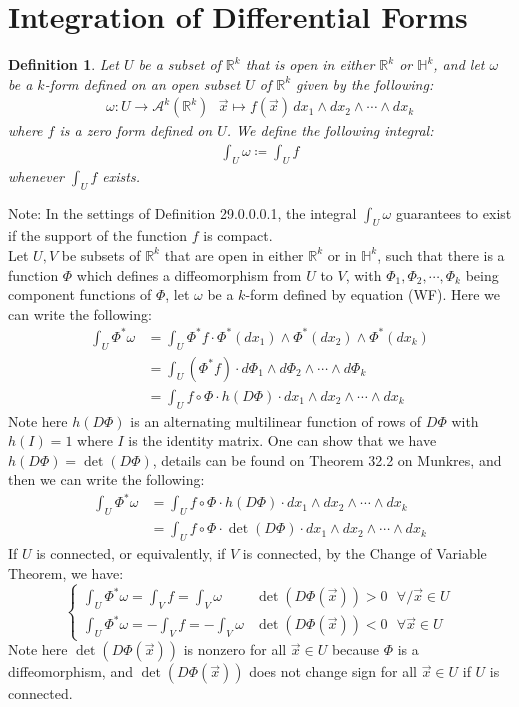 \documentclass[15pt]{book}
\theoremstyle{break}
\theoremstyle{break}
\newtheorem{defn}{Definition}[corL]
\newcommand{\R}{\mathbb{R}}
\newcommand{\A}{\mathcal{A}}
\newcommand{\note}{\color{red}Note: \color{black}}
\begin{document}
\newpage
\section[Integration of Differential Forms]{\color{red} Integration of Differential Forms \color{black}}
\begin{defn}
Let $U$ be a subset of $\R^k$ that is open in either $\R^k$ or $\mathbb{H}^k$, and let $\omega$ be a $k$-form defined on an open subset $U$ of $\R^k$ given by the following:
\begin{align*}
\omega:U \to \A^k(\R^k) \ \ \ \vec{x}\mapsto  f(\vec{x}) \,dx_1 \wedge dx_2 \wedge \cdots \wedge dx_k \tag{WF}
\end{align*}
where $f$ is a zero form defined on $U$. We define the following integral:
\begin{align*}
\int_U \omega \coloneqq \int_U f
\end{align*}
whenever $\int_U f$ exists.
\end{defn}
\note In the settings of Definition 29.0.0.0.1, the integral $\int_U \omega$ guarantees to exist if the support of the function $f$ is compact.\\

Let $U,V$ be subsets of $\R^k$ that are open in either $\R^k$ or in $\mathbb{H}^k$, such that there is a function $\Phi$ which defines a diffeomorphism from $U$ to $V$, with $\Phi_1, \Phi_2,\cdots, \Phi_k$ being component functions of $\Phi$, let $\omega$ be a $k$-form defined by equation (WF). Here we can write the following:
\begin{align*}
\int_U \Phi^*\omega &= \int_U \Phi^*f \cdot \Phi^*(dx_1)\wedge \Phi^*(dx_2)\wedge \Phi^*(dx_k)\\
&= \int_U (\Phi^* f) \cdot d\Phi_1 \wedge d\Phi_2 \wedge \cdots\wedge d\Phi_k \\
&= \int_U f\circ \Phi \cdot h(D\Phi) \cdot dx_1\wedge dx_2 \wedge \cdots \wedge dx_k
\end{align*}
Note here $h(D\Phi)$ is an alternating multilinear function of rows of $D\Phi$ with $h(I) = 1$ where $I$ is the identity matrix. One can show that we have $h(D\Phi) = \det(D\Phi)$, details can be found on Theorem 32.2 on Munkres, and then we can write the following:
\begin{align*}
\int_U \Phi^*\omega &= \int_U f\circ \Phi \cdot h(D\Phi) \cdot dx_1\wedge dx_2 \wedge \cdots \wedge dx_k\\
&= \int_U f\circ \Phi \cdot \det(D\Phi) \cdot dx_1\wedge dx_2 \wedge \cdots \wedge dx_k
\end{align*}
If $U$ is connected, or equivalently, if $V$ is connected, by the Change of Variable Theorem, we have:
$$\begin{cases}\int_U \Phi^*\omega =  \int_V f = \int_V \omega &  \det(D\Phi(\vec{x}))>0\ \ \ \forall/ \vec{x}\in U \\ \int_U \Phi^*\omega = - \int_V f = -\int_V \omega & \det(D\Phi(\vec{x}))<0\ \ \ \forall \vec{x}\in U \end{cases}$$ 
Note here $\det(D\Phi(\vec{x}))$ is nonzero for all $\vec{x}\in U$ because $\Phi$ is a diffeomorphism, and  $\det(D\Phi(\vec{x}))$ does not change sign for all $\vec{x}\in U$ if $U$ is connected. \\
\end{document}

